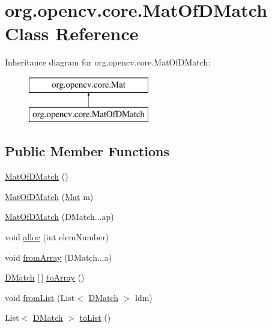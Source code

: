 \hypertarget{classorg_1_1opencv_1_1core_1_1_mat_of_d_match}{}\section{org.\+opencv.\+core.\+Mat\+Of\+D\+Match Class Reference}
\label{classorg_1_1opencv_1_1core_1_1_mat_of_d_match}
Inheritance diagram for org.\+opencv.\+core.\+Mat\+Of\+D\+Match\+:\begin{figure}[H]
\begin{center}
\leavevmode
\includegraphics[height=2.000000cm]{classorg_1_1opencv_1_1core_1_1_mat_of_d_match}
\end{center}
\end{figure}
\subsection*{Public Member Functions}
\begin{DoxyCompactItemize}
\item 
\mbox{\hyperlink{classorg_1_1opencv_1_1core_1_1_mat_of_d_match_af5a436778dbe9a483a3605fa7e5673f5}{Mat\+Of\+D\+Match}} ()
\item 
\mbox{\hyperlink{classorg_1_1opencv_1_1core_1_1_mat_of_d_match_a4ef8404e3677bcd19659e600748d2851}{Mat\+Of\+D\+Match}} (\mbox{\hyperlink{classorg_1_1opencv_1_1core_1_1_mat}{Mat}} m)
\item 
\mbox{\hyperlink{classorg_1_1opencv_1_1core_1_1_mat_of_d_match_a4825611edbfc5ba7bb3f1d9c085c83e6}{Mat\+Of\+D\+Match}} (D\+Match...\+ap)
\item 
void \mbox{\hyperlink{classorg_1_1opencv_1_1core_1_1_mat_of_d_match_a2fe9a7178ed938b3bdf26045318b9b84}{alloc}} (int elem\+Number)
\item 
void \mbox{\hyperlink{classorg_1_1opencv_1_1core_1_1_mat_of_d_match_a7a77dc58216137a5b401f00dc642a70b}{from\+Array}} (D\+Match...\+a)
\item 
\mbox{\hyperlink{classorg_1_1opencv_1_1features2d_1_1_d_match}{D\+Match}} \mbox{[}$\,$\mbox{]} \mbox{\hyperlink{classorg_1_1opencv_1_1core_1_1_mat_of_d_match_a249ef3529417b198d73a65d9fe703ea8}{to\+Array}} ()
\item 
void \mbox{\hyperlink{classorg_1_1opencv_1_1core_1_1_mat_of_d_match_a7ea1f2c684419b3e23720a2480458c28}{from\+List}} (List$<$ \mbox{\hyperlink{classorg_1_1opencv_1_1features2d_1_1_d_match}{D\+Match}} $>$ ldm)
\item 
List$<$ \mbox{\hyperlink{classorg_1_1opencv_1_1features2d_1_1_d_match}{D\+Match}} $>$ \mbox{\hyperlink{classorg_1_1opencv_1_1core_1_1_mat_of_d_match_a21bab2fd7ef5a59e3aa77b415f9d1521}{to\+List}} ()
\end{DoxyCompactItemize}
